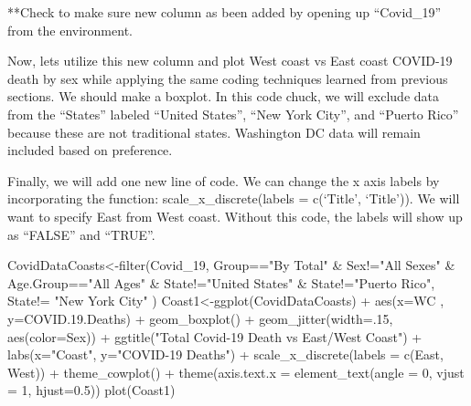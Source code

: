 \documentclass[
]{article}
\newenvironment{Shaded}{\begin{snugshade}}{\end{snugshade}}
\newcommand{\AttributeTok}[1]{\textcolor[rgb]{0.77,0.63,0.00}{#1}}
\newcommand{\DecValTok}[1]{\textcolor[rgb]{0.00,0.00,0.81}{#1}}
\newcommand{\FloatTok}[1]{\textcolor[rgb]{0.00,0.00,0.81}{#1}}
\newcommand{\FunctionTok}[1]{\textcolor[rgb]{0.00,0.00,0.00}{#1}}
\newcommand{\NormalTok}[1]{#1}
\newcommand{\OtherTok}[1]{\textcolor[rgb]{0.56,0.35,0.01}{#1}}
\newcommand{\SpecialCharTok}[1]{\textcolor[rgb]{0.00,0.00,0.00}{#1}}
\newcommand{\StringTok}[1]{\textcolor[rgb]{0.31,0.60,0.02}{#1}}
\begin{document}
**Check to make sure new column as been added by opening up
``Covid\_19'' from the environment.

Now, lets utilize this new column and plot West coast vs East coast
COVID-19 death by sex while applying the same coding techniques learned
from previous sections. We should make a boxplot. In this code chuck, we
will exclude data from the ``States'' labeled ``United States'', ``New
York City'', and ``Puerto Rico'' because these are not traditional
states. Washington DC data will remain included based on preference.

Finally, we will add one new line of code. We can change the x axis
labels by incorporating the function: scale\_x\_discrete(labels =
c(`Title', `Title')). We will want to specify East from West coast.
Without this code, the labels will show up as ``FALSE'' and ``TRUE''.

\begin{Shaded}
\begin{Highlighting}[]
\NormalTok{CovidDataCoasts}\OtherTok{\textless{}{-}}\FunctionTok{filter}\NormalTok{(Covid\_19, Group}\SpecialCharTok{==}\StringTok{"By Total"} \SpecialCharTok{\&}\NormalTok{ Sex}\SpecialCharTok{!=}\StringTok{"All Sexes"} \SpecialCharTok{\&}\NormalTok{ Age.Group}\SpecialCharTok{==}\StringTok{"All Ages"} \SpecialCharTok{\&}\NormalTok{ State}\SpecialCharTok{!=}\StringTok{"United States"} \SpecialCharTok{\&}\NormalTok{ State}\SpecialCharTok{!=}\StringTok{"Puerto Rico"}\NormalTok{, State}\SpecialCharTok{!=} \StringTok{"New York City"}\NormalTok{ )}
\NormalTok{Coast1}\OtherTok{\textless{}{-}}\FunctionTok{ggplot}\NormalTok{(CovidDataCoasts) }\SpecialCharTok{+}
  \FunctionTok{aes}\NormalTok{(}\AttributeTok{x=}\NormalTok{WC , }\AttributeTok{y=}\NormalTok{COVID.}\FloatTok{19.}\NormalTok{Deaths) }\SpecialCharTok{+}
  \FunctionTok{geom\_boxplot}\NormalTok{() }\SpecialCharTok{+}
  \FunctionTok{geom\_jitter}\NormalTok{(}\AttributeTok{width=}\NormalTok{.}\DecValTok{15}\NormalTok{, }\FunctionTok{aes}\NormalTok{(}\AttributeTok{color=}\NormalTok{Sex)) }\SpecialCharTok{+}
  \FunctionTok{ggtitle}\NormalTok{(}\StringTok{"Total Covid{-}19 Death vs East/West Coast"}\NormalTok{) }\SpecialCharTok{+}
  \FunctionTok{labs}\NormalTok{(}\AttributeTok{x=}\StringTok{"Coast"}\NormalTok{, }\AttributeTok{y=}\StringTok{"COVID{-}19 Deaths"}\NormalTok{) }\SpecialCharTok{+}
  \FunctionTok{scale\_x\_discrete}\NormalTok{(}\AttributeTok{labels =} \FunctionTok{c}\NormalTok{(}\StringTok{\textquotesingle{}East\textquotesingle{}}\NormalTok{, }\StringTok{\textquotesingle{}West\textquotesingle{}}\NormalTok{)) }\SpecialCharTok{+}
  \FunctionTok{theme\_cowplot}\NormalTok{() }\SpecialCharTok{+}
  \FunctionTok{theme}\NormalTok{(}\AttributeTok{axis.text.x =} \FunctionTok{element\_text}\NormalTok{(}\AttributeTok{angle =} \DecValTok{0}\NormalTok{, }\AttributeTok{vjust =} \DecValTok{1}\NormalTok{, }\AttributeTok{hjust=}\FloatTok{0.5}\NormalTok{))}
\FunctionTok{plot}\NormalTok{(Coast1)}
\end{Highlighting}
\end{Shaded}
\end{document}
